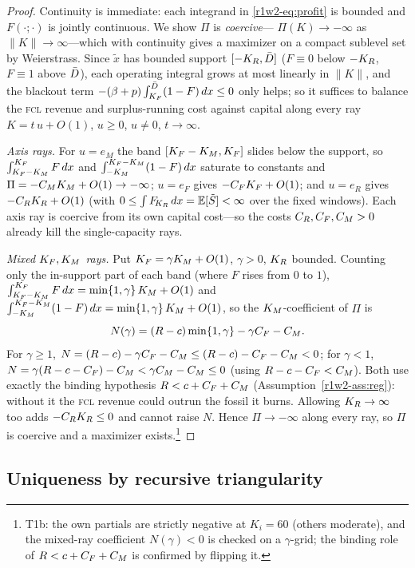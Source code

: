 \begin{proof}
Continuity is immediate: each integrand in \eqref{r1w2-eq:profit} is bounded and
$F(\cdot;\cdot)$ is jointly continuous. We show $\Pi$ is \emph{coercive}---
$\Pi(K)\to-\infty$ as $\|K\|\to\infty$---which with continuity gives a maximizer on
a compact sublevel set by Weierstrass. Since $\tilde x$ has bounded support
$[-K_R,\bar D]$ ($F\equiv0$ below $-K_R$, $F\equiv1$ above $\bar D$), each operating
integral grows at most linearly in $\|K\|$, and the blackout term
$-(\beta+p)\int_{K_F}^{\bar D}(1-F)\,dx\le0$ only helps; so it suffices to balance the
\textsc{fcl} revenue and surplus-running cost against capital along every ray
$K=t\,u+O(1)$, $u\ge0$, $u\neq0$, $t\to\infty$.

\emph{Axis rays.} For $u=e_M$ the band $[K_F-K_M,K_F]$ slides below the support, so
$\int_{K_F-K_M}^{K_F}F\,dx$ and $\int_{-K_M}^{K_F-K_M}(1-F)\,dx$ saturate to
constants and $\Pi=-C_MK_M+O(1)\to-\infty$; $u=e_F$ gives $-C_FK_F+O(1)$; and
$u=e_R$ gives $-C_RK_R+O(1)$ (with $0\le\int F_{\!K_R}\,dx=\mathbb{E}[\tilde S]<\infty$ over the
fixed windows). Each axis ray is coercive from its own capital cost---so the costs
$C_R,C_F,C_M>0$ already kill the single-capacity rays.

\emph{Mixed $K_F,K_M$ rays.} Put $K_F=\gamma K_M+O(1)$, $\gamma>0$, $K_R$ bounded.
Counting only the in-support part of each band (where $F$ rises from $0$ to $1$),
$\int_{K_F-K_M}^{K_F}F\,dx=\min\{1,\gamma\}\,K_M+O(1)$ and
$\int_{-K_M}^{K_F-K_M}(1-F)\,dx=\min\{1,\gamma\}\,K_M+O(1)$, so the
$K_M$-coefficient of $\Pi$ is
\[
  N(\gamma)=(R-c)\min\{1,\gamma\}-\gamma C_F-C_M .
\]
For $\gamma\ge1$, $N=(R-c)-\gamma C_F-C_M\le(R-c)-C_F-C_M<0$; for $\gamma<1$,
$N=\gamma(R-c-C_F)-C_M<\gamma C_M-C_M\le0$ (using $R-c-C_F<C_M$). Both use exactly
the binding hypothesis $R<c+C_F+C_M$ (Assumption~\ref{r1w2-ass:reg}): without it the
\textsc{fcl} revenue could outrun the fossil it burns. Allowing $K_R\to\infty$ too
adds $-C_RK_R\le0$ and cannot raise $N$. Hence $\Pi\to-\infty$ along every ray, so
$\Pi$ is coercive and a maximizer exists.\footnote{T1b: the own partials are
strictly negative at $K_i=60$ (others moderate), and the mixed-ray coefficient
$N(\gamma)<0$ is checked on a $\gamma$-grid; the binding role of $R<c+C_F+C_M$ is
confirmed by flipping it.}
\end{proof}

\subsection{Uniqueness by recursive triangularity}


